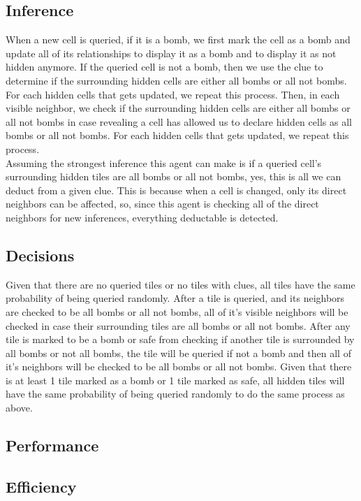 \documentclass[13pt]{report}
\begin{document}
\subsection*{Inference}
When a new cell is queried, if it is a bomb, we first mark the cell as a bomb and update all of its relationships to display it as a bomb and to display it as not hidden anymore. If the queried cell is not a bomb, then we use the clue to determine if the surrounding hidden cells are either all bombs or all not bombs. For each hidden cells that gets updated, we repeat this process. Then, in each visible neighbor, we check if the surrounding hidden cells are either all bombs or all not bombs in case revealing a cell has allowed us to declare hidden cells as all bombs or all not bombs. For each hidden cells that gets updated, we repeat this process.\\
Assuming the strongest inference this agent can make is if a queried cell's surrounding hidden tiles are all bombs or all not bombs, yes, this is all we can deduct from a given clue. This is because when a cell is changed, only its direct neighbors can be affected, so, since this agent is checking all of the direct neighbors for new inferences, everything deductable is detected.

\subsection*{Decisions}
Given that there are no queried tiles or no tiles with clues, all tiles have the same probability of being queried randomly. After a tile is queried, and its neighbors are checked to be all bombs or all not bombs, all of it's visible neighbors will be checked in case their surrounding tiles are all bombs or all not bombs. After any tile is marked to be a bomb or safe from checking if another tile is surrounded by all bombs or not all bombs, the tile will be queried if not a bomb and then all of it's neighbors will be checked to be all bombs or all not bombs. Given that there is at least 1 tile marked as a bomb or 1 tile marked as safe, all hidden tiles will have the same probability of being queried randomly to do the same process as above.

\subsection*{Performance}

\subsection*{Efficiency}
\end{document}
